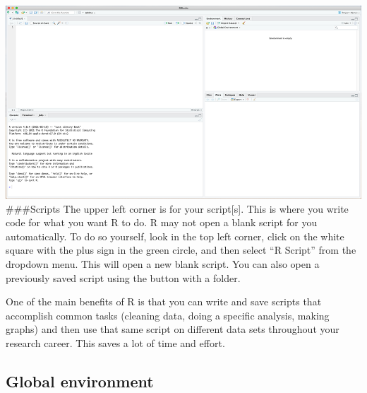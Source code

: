 \documentclass[
]{book}
\begin{document}
\includegraphics{images/Rwindow.png}
\#\#\#Scripts
The upper left corner is for your script{[}s{]}. This is where you write code for what you want R to do. R may not open a blank script for you automatically. To do so yourself, look in the top left corner, click on the white square with the plus sign in the green circle, and then select ``R Script'' from the dropdown menu. This will open a new blank script. You can also open a previously saved script using the button with a folder.

One of the main benefits of R is that you can write and save scripts that accomplish common tasks (cleaning data, doing a specific analysis, making graphs) and then use that same script on different data sets throughout your research career. This saves a lot of time and effort.

\hypertarget{global-environment}{%
\subsection{Global environment}\label{global-environment}}
\end{document}
